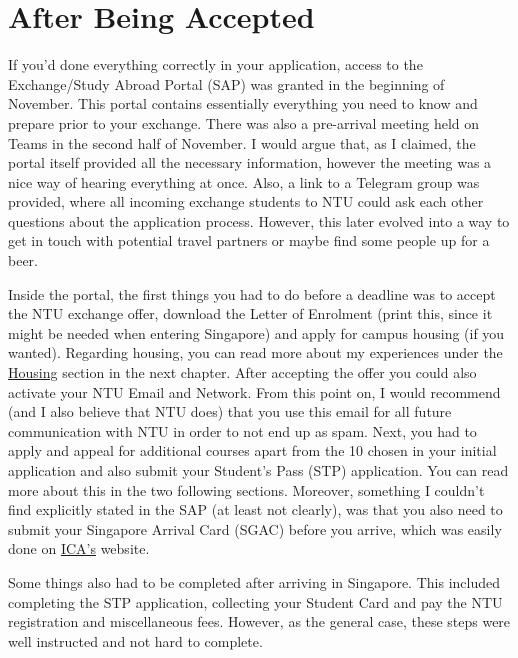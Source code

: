 \section*{After Being Accepted}
{}
If you'd done everything correctly in your application, access to the Exchange/Study Abroad Portal (SAP) was granted in the beginning of November. This portal contains essentially everything you need to know and prepare prior to your exchange. There was also a pre-arrival meeting held on Teams in the second half of November. I would argue that, as I claimed, the portal itself provided all the necessary information, however the meeting was a nice way of hearing everything at once. Also, a link to a Telegram group was provided, where all incoming exchange students to NTU could ask each other questions about the application process. However, this later evolved into a way to get in touch with potential travel partners or maybe find some people up for a beer.

Inside the portal, the first things you had to do before a deadline was to accept the NTU exchange offer, download the Letter of Enrolment (print this, since it might be needed when entering Singapore) and apply for campus housing (if you wanted). Regarding housing, you can read more about my experiences under the \hyperref[house]{Housing} section in the next chapter. After accepting the offer you could also activate your NTU Email and Network. From this point on, I would recommend (and I also believe that NTU does) that you use this email for all future communication with NTU in order to not end up as spam. Next, you had to apply and appeal for additional courses apart from the 10 chosen in your initial application and also submit your Student's Pass (STP) application. You can read more about this in the two following sections. Moreover, something I couldn't find explicitly stated in the SAP (at least not clearly), was that you also need to submit your Singapore Arrival Card (SGAC) before you arrive, which was easily done on \href{https://eservices.ica.gov.sg/sgarrivalcard/}{ICA's} website.

Some things also had to be completed after arriving in Singapore. This included completing the STP application, collecting your Student Card and pay the NTU registration and miscellaneous fees. However, as the general case, these steps were well instructed and not hard to complete.


